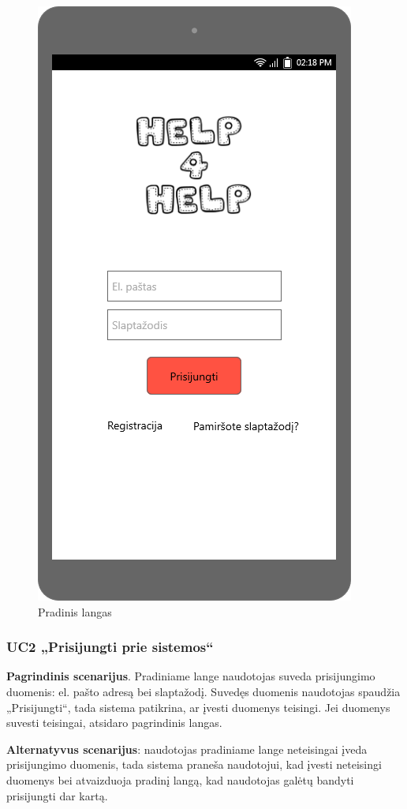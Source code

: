 \documentclass{VUMIFPSbakalaurinis}
\begin{document}
\begin{figure}[H]
	\centering
	\includegraphics[scale=0.4]{img/ScreenShots/01-Pradinis-langas}
	\caption{Pradinis langas}
	\label{img:login}
\end{figure}
\subsubsection{UC2 „Prisijungti prie sistemos“}
\textbf{Pagrindinis scenarijus}. Pradiniame lange naudotojas suveda prisijungimo duomenis: el. pašto adresą bei slaptažodį. Suvedęs duomenis naudotojas spaudžia „Prisijungti“, tada sistema patikrina, ar įvesti duomenys teisingi. Jei duomenys suvesti teisingai, atsidaro pagrindinis langas.
\par \textbf{Alternatyvus scenarijus}: naudotojas pradiniame lange neteisingai įveda prisijungimo duomenis, tada sistema praneša naudotojui, kad įvesti neteisingi duomenys bei atvaizduoja pradinį langą, kad naudotojas galėtų bandyti prisijungti dar kartą.
\end{document}
